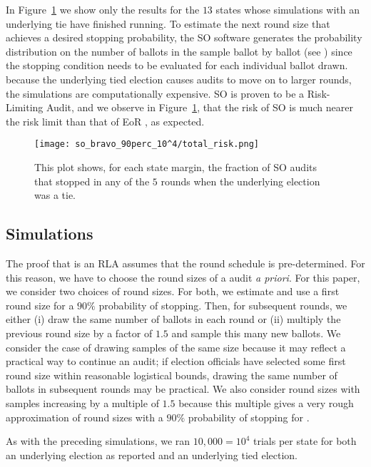 In Figure~\ref{fig:so_bravo_risk} we show only the results for the $13$
states whose simulations with an underlying tie have finished running.
To estimate the next round size that achieves a desired stopping probability,
the SO \BRAVO software generates the probability distribution on the number of ballots in the sample ballot by ballot (see \cite{usenix_minerva}) since
the stopping condition needs to be evaluated for each individual ballot drawn.
because the underlying tied election causes audits to move on to larger rounds, 
the simulations are computationally expensive. SO \BRAVO is proven to be a Risk-Limiting Audit,
and we observe in Figure~\ref{fig:so_bravo_risk},
that the risk of SO \BRAVO is much
nearer the risk limit than that of EoR \BRAVO, as expected. 

\begin{figure}
\texttt{[image: so\_bravo\_90perc\_10^4/total\_risk.png]}
\caption{This plot shows, for each state margin,
the fraction of SO \BRAVO audits that stopped in any of the $5$ rounds when the underlying election was a tie.}
\label{fig:so_bravo_risk}
\end{figure}


\subsection{\Minerva Simulations}
The proof that \Minerva is an RLA \cite{usenix_minerva} assumes that the round schedule is pre-determined. For this reason, we have to choose the round sizes of a \Minerva 
audit {\em a priori}.
For this paper, we consider two choices of round sizes.
For both, we estimate and use a first round size 
for
a $90\%$ probability of stopping.
Then, for subsequent rounds, we either (i) 
draw the same number of ballots in each round or (ii)
multiply the previous round size by a factor of $1.5$ and 
sample this many new ballots.
We consider the case of drawing samples of the same size
because it may reflect a practical way to continue an
audit; if election officials have selected some first round size within
reasonable logistical bounds, drawing the same number of 
ballots in subsequent rounds may be practical.
We also consider round sizes with samples increasing by a multiple
of $1.5$ because this multiple gives a very rough approximation of 
round sizes with a $90\%$ probability of stopping for \Minerva. 

As with the preceding simulations, we ran $10,000=10^4$ trials
per state for both an underlying election as reported and an underlying tied election. 

